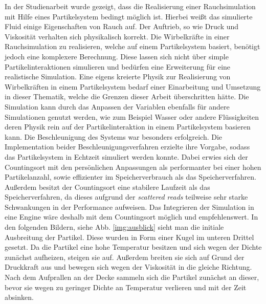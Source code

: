 \documentclass[intern,palatino]{cgBA}
\begin{document}
In der Studienarbeit wurde gezeigt, dass die Realisierung einer Rauchsimulation mit Hilfe eines Partikelsystem bedingt möglich ist. Hierbei weißt das simulierte Fluid einige Eigenschaften von Rauch auf. Der Auftrieb, so wie Druck und Viskosität verhalten sich physikalisch korrekt. Die Wirbelkräfte in einer Rauchsimulation zu realisieren, welche auf einem Partikelsystem basiert, benötigt jedoch eine komplexere Berechnung. Diese lassen sich nicht über simple Partikelinteraktionen simulieren und bedürfen eine Erweiterung für eine realistische Simulation. Eine eigens kreierte Physik zur Realisierung von Wirbelkräften in einem Partikelsystem bedarf einer Einarbeitung und Umsetzung in dieser Thematik, welche die Grenzen dieser Arbeit überschritten hätte.
\newline
Die Simulation kann durch das Anpassen der Variablen ebenfalls für andere Simulationen genutzt werden, wie zum Beispiel Wasser oder andere Flüssigkeiten deren Physik rein auf der Partikelinteraktion in einem Partikelsystem basieren kann.
\newline
Die Beschleunigung des Systems war besonders erfolgreich. Die Implementation beider Beschleunigungsverfahren erzielte ihre Vorgabe, sodass das Partikelsystem in Echtzeit simuliert werden konnte. Dabei erwies sich der Countingsort mit den persönlichen Anpassungen als performanter bei einer hohen Partikelanzahl, sowie effizienter im Speicherverbrauch als das Speicherverfahren. Außerdem besitzt der Countingsort eine stabilere Laufzeit als das Speicherverfahren, da dieses aufgrund der \textit{scattered reads} teilweise sehr starke Schwankungen in der Performance aufweisen. 
\newline
Das Integrieren der Simulation in eine Engine  wäre deshalb mit dem Countingsort möglich und empfehlenswert.
\newline
In den folgenden Bildern, siehe Abb. \ref{img:ausblick} sieht man die initiale Ausbreitung der Partikel. Diese wurden in Form einer Kugel im unteren Drittel gesetzt. Da die Partikel eine hohe Temperatur besitzen und sich wegen der Dichte zunächst aufheizen, steigen sie auf. Außerdem breiten sie sich auf Grund der Druckkraft aus und bewegen sich wegen der Viskosität in die gleiche Richtung. Nach dem Aufprallen an der Decke sammeln sich die Partikel zunächst an dieser, bevor sie wegen zu geringer Dichte an Temperatur verlieren und mit der Zeit absinken.
\end{document}

